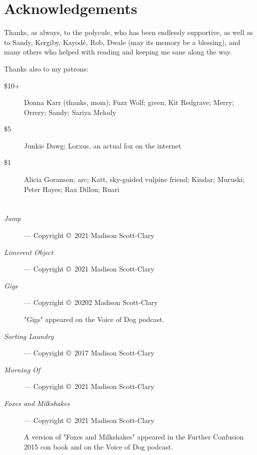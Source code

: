 \chapter*{Acknowledgements}

Thanks, as always, to the polycule, who has been endlessly supportive, as well as to Sandy, Kergiby, Kayodé, Rob, Dwale (may its memory be a blessing), and many others who helped with reading and keeping me sane along the way.

Thanks also to my patrons:

\begin{description}
    \item[\$10+]
    Donna Karr (thanks, mom); Fuzz Wolf; green; Kit Redgrave; Merry; Orrery; Sandy; Sariya Melody

    \item[\$5]
    Junkie Dawg; Lorxus, an actual fox on the internet

    \item[\$1]
    Alicia Goranson; arc; Katt, sky-guided vulpine friend; Kindar; Muruski; Peter Hayes; Rax Dillon; Ruari
\end{description}

\chapter*{}

\begin{description}
    \item[\emph{Jump}]
    --- Copyright \copyright\ 2021 Madison Scott-Clary

    \item[\emph{Limerent Object}]
    --- Copyright \copyright\ 2021 Madison Scott-Clary

    \item[\emph{Gigs}]
    --- Copyright \copyright\ 20202 Madison Scott-Clary

    "Gigs" appeared on the Voice of Dog podcast.

    \item[\emph{Sorting Laundry}]
    --- Copyright \copyright\ 2017 Madison Scott-Clary

    \item[\emph{Morning Of}]
    --- Copyright \copyright\ 2021 Madison Scott-Clary

    \item[\emph{Foxes and Milkshakes}]
    --- Copyright \copyright\ 2021 Madison Scott-Clary

    A version of "Foxes and Milkshakes" appeared in the Further Confusion 2015 con book and on the Voice of Dog podcast.
\end{description}
\newpage
\thispagestyle{empty}
\null
\vfill

